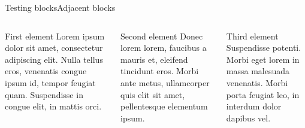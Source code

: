 \documentclass[aspectratio=169]{beamer}
\begin{document}


\begin{frame}{Testing blocks}{Adjacent blocks}
  \begin{columns}[t]
    \begin{column}{0.4\textwidth}
      \begin{block}{First element}
        Lorem ipsum dolor sit amet, consectetur adipiscing elit. Nulla tellus eros, venenatis congue ipsum id, tempor feugiat quam. Suspendisse in congue elit, in mattis orci.
      \end{block}
    \end{column}

    \begin{column}{0.3\textwidth}
      \begin{block}{Second element}
        Donec lorem lorem, faucibus a mauris et, eleifend tincidunt eros. Morbi ante metus, ullamcorper quis elit sit amet, pellentesque elementum ipsum.
      \end{block}
    \end{column}

    \begin{column}{0.3\textwidth}
      \begin{block}{Third element}
        Suspendisse potenti. Morbi eget lorem in massa malesuada venenatis. Morbi porta feugiat leo, in interdum dolor dapibus vel.
      \end{block}
    \end{column}
  \end{columns}
\end{frame}


\end{document}
